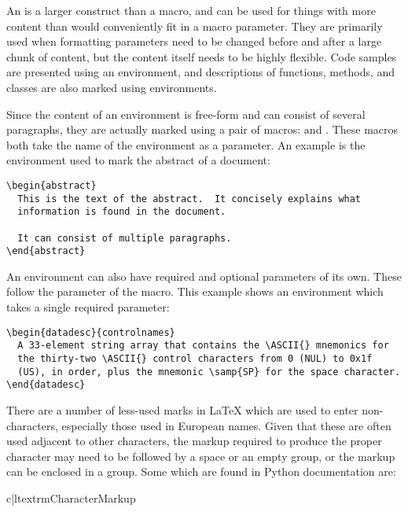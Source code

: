 \documentclass{howto}
\begin{document}
    An  is a larger construct than a macro, and can
    be used for things with more content than would conveniently fit
    in a macro parameter.  They are primarily used when formatting
    parameters need to be changed before and after a large chunk of
    content, but the content itself needs to be highly flexible.  Code
    samples are presented using an environment, and descriptions of
    functions, methods, and classes are also marked using environments.

    Since the content of an environment is free-form and can consist
    of several paragraphs, they are actually marked using a pair of
    macros:  and .  These macros both take the
    name of the environment as a parameter.  An example is the
    environment used to mark the abstract of a document:

\begin{verbatim}
\begin{abstract}
  This is the text of the abstract.  It concisely explains what
  information is found in the document.

  It can consist of multiple paragraphs.
\end{abstract}
\end{verbatim}

    An environment can also have required and optional parameters of
    its own.  These follow the parameter of the  macro.
    This example shows an environment which takes a single required
    parameter:

\begin{verbatim}
\begin{datadesc}{controlnames}
  A 33-element string array that contains the \ASCII{} mnemonics for
  the thirty-two \ASCII{} control characters from 0 (NUL) to 0x1f
  (US), in order, plus the mnemonic \samp{SP} for the space character.
\end{datadesc}
\end{verbatim}

    There are a number of less-used marks in \LaTeX{} which are used
    to enter non-\ASCII{} characters, especially those used in
    European names.  Given that these are often used adjacent to other
    characters, the markup required to produce the proper character
    may need to be followed by a space or an empty group, or the
    markup can be enclosed in a group.  Some which are found in Python
    documentation are:

\begin{tableii}{c|l}{textrm}{Character}{Markup}
\end{tableii}
\end{document}
